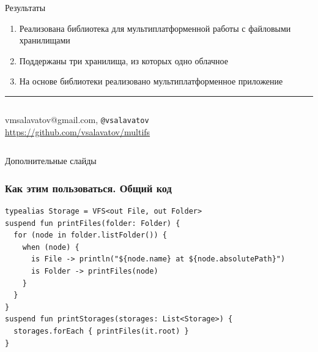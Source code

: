 \documentclass[14pt,aspectratio=169,hyperref={pdftex,unicode},xcolor=dvipsnames]{beamer}
\begin{document}
\begin{frame}{Результаты}
  \begin{enumerate}
  \item Реализована библиотека для мультиплатформенной работы с файловыми хранилищами
  \item Поддержаны три хранилища, из которых одно облачное
  \item На основе библиотеки реализовано мультиплатформенное приложение
  \end{enumerate}

  \vspace{2mm}\hrule\vspace{1mm}
    \begin{columns}
      \begin{center}
       vmsalavatov@gmail.com, \texttt{@vsalavatov} \\ 
        \url{https://github.com/vsalavatov/multifs}
      \end{center}
      
      \begin{center}
      \end{center}
    \end{columns}  
  
\end{frame}



\setcounter{finalframe}{\value{framenumber}}

\begin{frame}
  \begin{center}
  Дополнительные слайды
  \end{center}
\end{frame}


\begin{frame}[fragile]
\frametitle{Как этим пользоваться. Общий код}
\begin{verbatim}
typealias Storage = VFS<out File, out Folder>
suspend fun printFiles(folder: Folder) {
  for (node in folder.listFolder()) {
    when (node) {
      is File -> println("${node.name} at ${node.absolutePath}")
      is Folder -> printFiles(node)
    }
  }
}
suspend fun printStorages(storages: List<Storage>) {
  storages.forEach { printFiles(it.root) }
}
\end{verbatim}
\end{frame}
\end{document}
